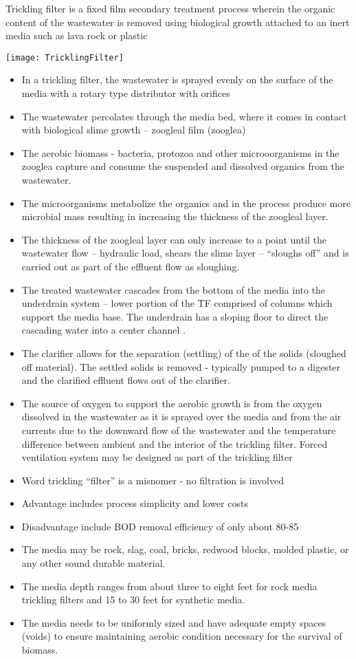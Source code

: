 \documentclass{article}
\begin{document}
Trickling filter is a fixed film secondary treatment process wherein the organic content of the wastewater is removed using biological growth attached to an inert media such as lava rock or plastic\\
\begin{center}
\texttt{[image: TricklingFilter]}
\end{center}		
\begin{itemize}
\item In a trickling filter, the wastewater is sprayed evenly on the surface of the media with a rotary type distributor with orifices
\item The wastewater percolates through the media bed, where it comes in contact with biological slime growth – zoogleal film (zooglea)
\item The aerobic biomass - bacteria, protozoa and other microoorganisms in the zooglea capture and consume the suspended and dissolved organics from the wastewater.
\item The microorganisms metabolize the organics and in the process produce more microbial mass resulting in increasing the thickness of the zoogleal layer.
\item The thickness of the zoogleal layer can only increase to a point until the wastewater flow – hydraulic load, shears the slime layer – “sloughs off” and is carried out as part of the effluent flow as sloughing.
\item The treated wastewater cascades from the bottom of the media into the underdrain system – lower portion of the TF comprised of columns which support the media base.  The underdrain has a sloping floor to direct the cascading water into a center channel .
\item The clarifier allows for the separation (settling) of the  of the solids (sloughed off material).  The settled solids is removed - typically pumped to a digester and the clarified effluent flows out of the clarifier.
\item The source of oxygen to support the aerobic growth is from the oxygen dissolved in the wastewater as it is sprayed over the media and from the air currents due to the downward flow of the wastewater and the temperature difference between ambient and the interior of the trickling filter.  Forced ventilation system may be designed as part of the trickling filter

\item Word trickling “filter” is a misnomer - no filtration is involved
\item Advantage includes process simplicity and lower costs
\item Disadvantage include BOD removal efficiency of only about 80-85%
\item The media may be rock, slag, coal, bricks, redwood blocks, molded plastic, or any other sound durable material.
\item The media depth ranges from about three to eight feet for rock media trickling filters and 15 to 30 feet for synthetic media.
\item The media needs to be uniformly sized and have adequate empty spaces (voids) to ensure maintaining aerobic condition necessary for the survival of biomass.  


\end{itemize}
\end{document}

